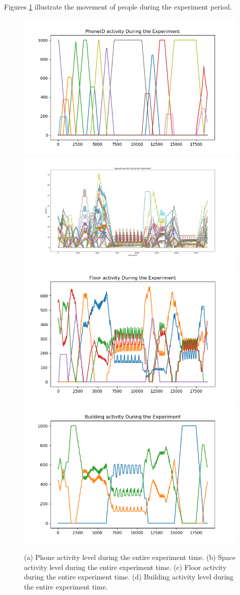 \documentclass[../UNBThesis2.tex]{subfiles}
\begin{document}
Figures \ref{alltogether} illustrate the movement of people during the experiment period. 







\begin{figure}
    \centering
        \includegraphics[width = 7 cm]{image/Chapters/Chapter6/phoneTime.png}\hfill
        \includegraphics[width = 7 cm]{image/Chapters/Chapter6/spaceidAccumulat.png}\hfill
        \includegraphics[width = 7 cm]{image/Chapters/Chapter6/floorTime.png}\hfill
        \includegraphics[width = 7 cm]{image/Chapters/Chapter6/buildingTime.png}
    \caption{(a) Phone activity level during the entire experiment time. (b) Space activity level during the entire experiment time. (c) Floor activity during the entire experiment time. (d) Building activity level during the entire experiment time.}
    \label{alltogether}
\end{figure}
\end{document}
